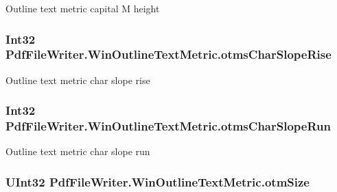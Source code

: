 Outline text metric capital M height 

\subsubsection[{\texorpdfstring{otms\+Char\+Slope\+Rise}{otmsCharSlopeRise}}]{\setlength{\rightskip}{0pt plus 5cm}Int32 Pdf\+File\+Writer.\+Win\+Outline\+Text\+Metric.\+otms\+Char\+Slope\+Rise\hspace{0.3cm}{\ttfamily [get]}}\hypertarget{class_pdf_file_writer_1_1_win_outline_text_metric_a4e5a836a0b9cc2cd2b85010bb867e358}{}\label{class_pdf_file_writer_1_1_win_outline_text_metric_a4e5a836a0b9cc2cd2b85010bb867e358}


Outline text metric char slope rise 

\subsubsection[{\texorpdfstring{otms\+Char\+Slope\+Run}{otmsCharSlopeRun}}]{\setlength{\rightskip}{0pt plus 5cm}Int32 Pdf\+File\+Writer.\+Win\+Outline\+Text\+Metric.\+otms\+Char\+Slope\+Run\hspace{0.3cm}{\ttfamily [get]}}\hypertarget{class_pdf_file_writer_1_1_win_outline_text_metric_a040e8003bfc0aa6badae6b7a34a400d8}{}\label{class_pdf_file_writer_1_1_win_outline_text_metric_a040e8003bfc0aa6badae6b7a34a400d8}


Outline text metric char slope run 

\subsubsection[{\texorpdfstring{otm\+Size}{otmSize}}]{\setlength{\rightskip}{0pt plus 5cm}U\+Int32 Pdf\+File\+Writer.\+Win\+Outline\+Text\+Metric.\+otm\+Size\hspace{0.3cm}{\ttfamily [get]}}\hypertarget{class_pdf_file_writer_1_1_win_outline_text_metric_ab408b6c5d521ab2bb8a9233cf413341b}{}\label{class_pdf_file_writer_1_1_win_outline_text_metric_ab408b6c5d521ab2bb8a9233cf413341b}


